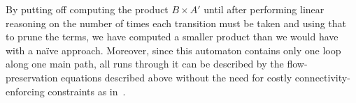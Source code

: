 By putting off computing the product $B \times A'$ until after performing linear
reasoning on the number of times each transition must be taken and using that to
prune the terms, we have computed a smaller product than we would have with a
na\"ive approach. Moreover, since this automaton contains only one loop along
one main path, all runs through it can be described by the flow-preservation
equations described above without the need for costly connectivity-enforcing
constraints as in~\cite{generate-parikh-image}.